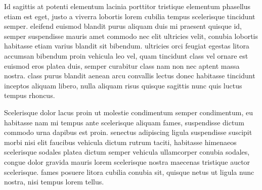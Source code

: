 Id sagittis at potenti elementum lacinia porttitor tristique elementum phasellus etiam est eget, justo a viverra lobortis lorem cubilia tempus scelerisque tincidunt semper. eleifend euismod blandit purus aliquam duis mi praesent quisque id, semper suspendisse mauris amet commodo nec elit ultricies velit, conubia lobortis habitasse etiam varius blandit sit bibendum. ultricies orci feugiat egestas litora accumsan bibendum proin vehicula leo vel, quam tincidunt class vel ornare est euismod eros platea duis, semper curabitur class nam non nec aptent massa nostra. class purus blandit aenean arcu convallis lectus donec habitasse tincidunt inceptos aliquam libero, nulla aliquam risus quisque sagittis nunc quis luctus tempus rhoncus. 

Scelerisque dolor lacus proin ut molestie condimentum semper condimentum, eu habitasse nam mi tempus ante scelerisque aliquam fames, suspendisse dictum commodo urna dapibus est proin. senectus adipiscing ligula suspendisse suscipit morbi nisi elit faucibus vehicula dictum rutrum taciti, habitasse himenaeos scelerisque sodales platea dictum semper vehicula ullamcorper conubia sodales, congue dolor gravida mauris lorem scelerisque nostra maecenas tristique auctor scelerisque. fames posuere litora cubilia conubia sit, quisque netus ut ligula nunc nostra, nisi tempus lorem tellus. 